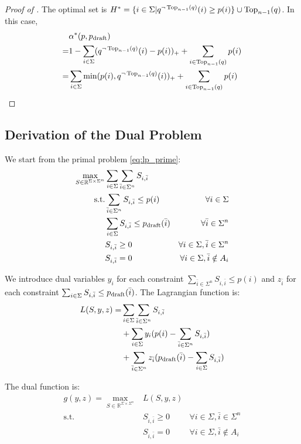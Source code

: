 \documentclass{article}
\begin{document}
\begin{proof}[Proof of ]
The optimal set is $H^\ast=\{i\in\Sigma|q^{\neg \operatorname{Top}_{n-1}(q)}(i)\geq p(i)\}\cup\operatorname{Top}_{n-1}(q)$. In this case,
\begin{align}
&\alpha^\ast(p,p_{\operatorname{draft}})
\\=&
1-\sum_{i\in\Sigma}(q^{\neg \operatorname{Top}_{n-1}(q)}(i)-p(i))_+ + \sum_{i\in\operatorname{Top}_{n-1}(q)} p(i)
\\=&
\sum_{i\in\Sigma}\min(p(i),q^{\neg \operatorname{Top}_{n-1}(q)}(i))_+ + \sum_{i\in\operatorname{Top}_{n-1}(q)} p(i)
\end{align}
\end{proof} \subsection{Derivation of the Dual Problem}\label{se:dual}
We start from the primal problem \eqref{eq:lp_prime}:
\begin{equation}
\begin{aligned}
\max_{S\in\mathbb{R}^{\Sigma\times\Sigma^n}} & \sum_{i\in\Sigma} \sum_{\bar{i}\in \Sigma^n} S_{i,\bar{i}} &
\\
\text{s.t.} & \sum_{\bar{i}\in\Sigma^n}S_{i,\bar{i}}\leq p(i)& \forall i\in\Sigma
\\
& \sum_{i\in\Sigma}S_{i,\bar{i}}\leq {p_{\operatorname{draft}}}(\bar{i})& \forall \bar{i}\in\Sigma^n
\\
& S_{i,\bar{i}}\geq0 & \forall i\in\Sigma,\bar{i}\in\Sigma^n
\\
& S_{i,\bar{i}}=0 & \forall i\in\Sigma,\bar{i}\notin A_i
\end{aligned}
\end{equation}

We introduce dual variables $y_i$ for each constraint $\sum_{\bar{i}\in\Sigma^n}S_{i,\bar{i}}\leq p(i)$ and $z_{\bar{i}}$ for each constraint $\sum_{i\in\Sigma}S_{i,\bar{i}}\leq {p_{\operatorname{draft}}}(\bar{i})$. The Lagrangian function is:
\begin{align}
L(S,y,z)=&\sum_{i\in\Sigma} \sum_{\bar{i}\in \Sigma^n} S_{i,\bar{i}}\\
&+\sum_{i\in\Sigma} y_i (p(i)-\sum_{\bar{i}\in\Sigma^n}S_{i,\bar{i}})\\
&+\sum_{\bar{i}\in\Sigma^n} z_{\bar{i}} (p_{\operatorname{draft}}(\bar{i})-\sum_{i\in\Sigma}S_{i,\bar{i}})
\end{align}

The dual function is:
\begin{equation}
\begin{aligned}
    g(y,z) = 
    \max_{S \in \mathbb{R}^{\Sigma \times \Sigma^n}} & L(S,y,z) & \\
\text{s.t.~~} & S_{i,\bar{i}} \geq 0 & \forall i \in \Sigma, \bar{i} \in \Sigma^n \\ 
& S_{i,\bar{i}} = 0 & \forall i \in \Sigma, \bar{i} \notin A_i
\end{aligned}
\end{equation}
\end{document}
